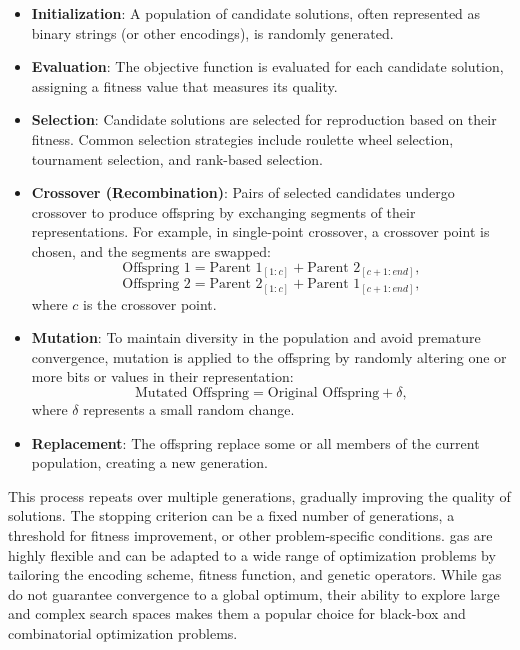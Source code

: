 \begin{itemize}
    \item \textbf{Initialization}: A population of candidate solutions, often represented as binary strings (or other encodings), is randomly generated.
    
    \item \textbf{Evaluation}: The objective function is evaluated for each candidate solution, assigning a fitness value that measures its quality.
    
    \item \textbf{Selection}: Candidate solutions are selected for reproduction based on their fitness. Common selection strategies include roulette wheel selection, tournament selection, and rank-based selection.
    
    \item \textbf{Crossover (Recombination)}: Pairs of selected candidates undergo crossover to produce offspring by exchanging segments of their representations. For example, in single-point crossover, a crossover point is chosen, and the segments are swapped:
    \begin{equation}
    \text{Offspring 1} = \text{Parent 1}_{[1:c]} + \text{Parent 2}_{[c+1:end]},
    \end{equation}
    \begin{equation}
    \text{Offspring 2} = \text{Parent 2}_{[1:c]} + \text{Parent 1}_{[c+1:end]},
    \end{equation}
    where \(c\) is the crossover point.
    
    \item \textbf{Mutation}: To maintain diversity in the population and avoid premature convergence, mutation is applied to the offspring by randomly altering one or more bits or values in their representation:
    \begin{equation}
    \text{Mutated Offspring} = \text{Original Offspring} + \delta,
    \end{equation}
    where \(\delta\) represents a small random change.
    
    \item \textbf{Replacement}: The offspring replace some or all members of the current population, creating a new generation.
\end{itemize}

This process repeats over multiple generations, gradually improving the quality of solutions. The stopping criterion can be a fixed number of generations, a threshold for fitness improvement, or other problem-specific conditions.
\acp{ga} are highly flexible and can be adapted to a wide range of optimization problems by tailoring the encoding scheme, fitness function, and genetic operators. While \acp{ga} do not guarantee convergence to a global optimum, their ability to explore large and complex search spaces makes them a popular choice for black-box and combinatorial optimization problems.

